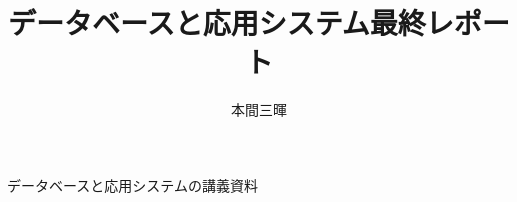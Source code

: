 \documentclass[titlepage,a4paper]{jsarticle}
\title{データベースと応用システム最終レポート}
\author{本間三暉}
\begin{document}
\maketitle

\section{}
\begin{thebibliography}{99}
  \bibitem{}データベースと応用システムの講義資料
\end{thebibliography}
\end{document}
